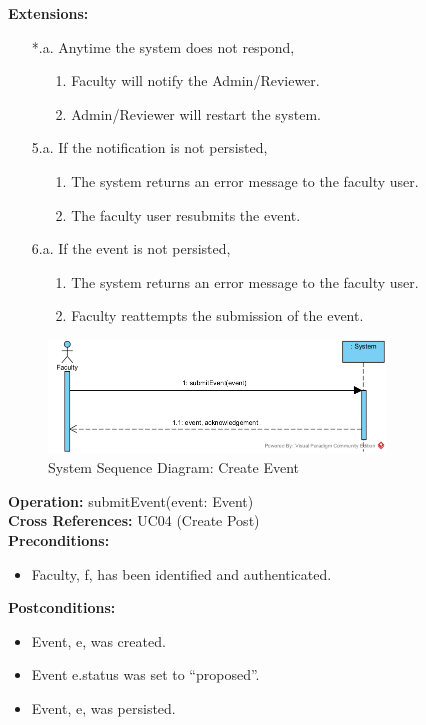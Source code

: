 \textbf{Extensions:}
\begin{enumerate}
    \item[*.a.] Anytime the system does not respond,
    \begin{enumerate}
        \item[1.] Faculty will notify the Admin/Reviewer.
        \item[2.] Admin/Reviewer will restart the system.
    \end{enumerate}
    \item [5.a.] If the notification is not persisted,
    \begin{enumerate}
        \item [1.] The system returns an error message to the faculty user.
        \item[2.] The faculty user resubmits the event.
    \end{enumerate}
    \item [6.a.] If the event is not persisted,
    \begin{enumerate}
        \item [1.] The system returns an error message to the faculty user.
        \item [2.] Faculty reattempts the submission of the event.
    \end{enumerate}
\end{enumerate}

\begin{figure}[H]
    \centering
    \includegraphics[width=0.8\textwidth]{images/SSD-UC04-CreateEvent.png}
    \centering
    \caption{System Sequence Diagram: Create Event}
\end{figure}

\textbf{Operation:} submitEvent(event: Event) \\
\textbf{Cross References:} UC04 (Create Post) \\
\textbf{Preconditions:}
\begin{itemize}
    \item Faculty, f, has been identified and authenticated.
\end{itemize}
\textbf{Postconditions:}
\begin{itemize}
    \item Event, e, was created.
    \item Event e.status was set to “proposed”.
    \item Event, e, was persisted.
\end{itemize}